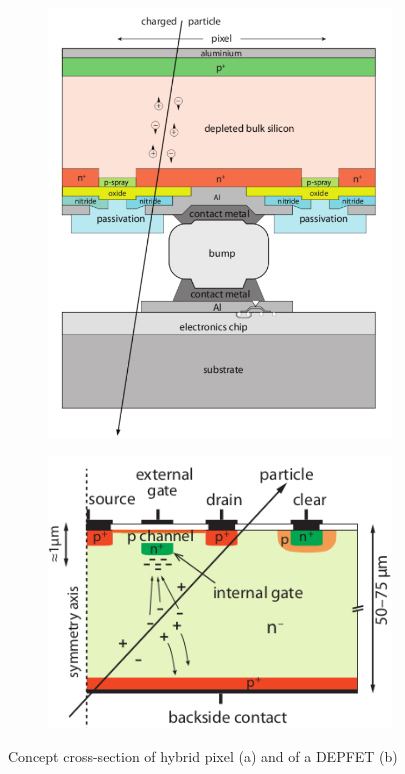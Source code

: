    \begin{figure}
      \begin{subfigure}{.5\textwidth}
      \centering
      \includegraphics[width=.6\linewidth]{figures/Pixel_detectors/hybrid_scheme.png}
      \end{subfigure}%
      \begin{subfigure}{.5\textwidth}
      \centering
      \includegraphics[width=.8\linewidth]{figures/Pixel_detectors/DEPFET_scheme.png}
      \end{subfigure}
      \caption{Concept cross-section of hybrid pixel (a) and of a DEPFET (b)}
      \label{fig:hybrid_DEPFET_scheme}
   \end{figure} 

